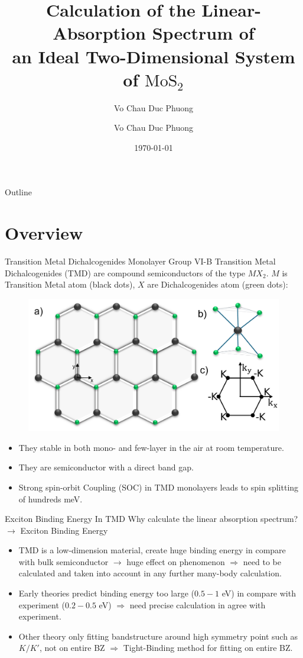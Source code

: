 \documentclass{beamer}
\author{Vo Chau Duc Phuong}
\title{Calculation of the Linear-Absorption Spectrum of\\ an Ideal Two-Dimensional System of $\mathrm{MoS}_2$}
\author{Vo Chau Duc Phuong}
\date{\today}
\begin{document}
	\small
	\begin{frame}
		\titlepage 
	\end{frame}
	
	\logo{}
	
	
	\begin{frame}{Outline}
		\tableofcontents
	\end{frame}
	
	
	\section{Overview}	
	
	
	\begin{frame}{Transition Metal Dichalcogenides Monolayer}
		Group VI-B Transition Metal Dichalcogenides (TMD) are compound semiconductors of the type $MX_2$. $M$ is Transition Metal atom (black dots), $X$ are Dichalcogenides atom (green dots):
		\begin{figure}
			\includegraphics[width=0.4\linewidth]{images/RS.pdf}
		\end{figure}
		\begin{itemize}
			\item They stable in both mono- and few-layer in the air at room temperature.\\
			\item They are semiconductor with a direct band gap.\\
			\item Strong spin-orbit Coupling (SOC) in TMD monolayers leads to spin splitting of hundreds meV.
		\end{itemize}
	\end{frame}
	\begin{frame}{Exciton Binding Energy In TMD}
		Why calculate the linear absorption spectrum?\\ $\to$ Exciton Binding Energy
		\begin{itemize}
			\item TMD is a low-dimension material, create huge binding energy in compare with bulk semiconductor $\to$ huge effect on phenomenon $\Rightarrow$ need to be calculated and taken into account in any further many-body calculation.
			\item Early theories predict binding energy too large ($0.5-1$ eV) in compare with experiment ($0.2-0.5$ eV) $\Rightarrow$ need precise calculation in agree with experiment.
			\item Other theory only fitting bandstructure around high symmetry point such as $K/K'$, not on entire BZ $\Rightarrow$ Tight-Binding method for fitting on entire BZ.
		\end{itemize}
	\end{frame}
\end{document}
